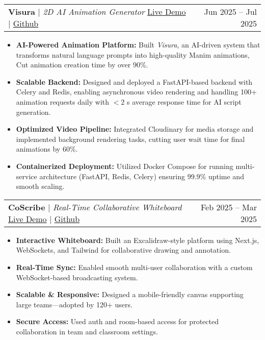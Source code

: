 \documentclass[letterpaper,11pt]{article}
\makeatletter
\newcommand{\resumeProjectHeading}[2]{
    \item
    \begin{tabular*}{0.97\textwidth}{l@{\extracolsep{\fill}}r}
      \small#1 & #2 \\
    \end{tabular*}\vspace{-7pt}
}
\makeatother
\begin{document}
    \resumeProjectHeading
           {\large \textbf{Visura} $|$ \emph{2D AI Animation Generator} 
           \href{https://visura.space/}{Live Demo} $|$    \href{https://github.com/Devansh-Sabharwal/visura}{Github}}{Jun 2025 – Jul 2025 } 
\begin{itemize}[leftmargin=0.3in,label={$\bullet$}]
    \item \textbf{AI-Powered Animation Platform:} Built \textit{Visura}, an AI-driven system that transforms natural language prompts into high-quality Manim animations, Cut animation creation time by over 90\%.
    \item \textbf{Scalable Backend:} Designed and deployed a FastAPI-based backend with Celery and Redis, enabling asynchronous video rendering and handling 100+ animation requests daily with $<$2 s average response time for AI script generation.
    \item \textbf{Optimized Video Pipeline:} Integrated Cloudinary for media storage and implemented background rendering tasks, cutting user wait time for final animations by 60\%.
    \item \textbf{Containerized Deployment:} Utilized Docker Compose for running multi-service architecture (FastAPI, Redis, Celery) ensuring 99.9\% uptime and smooth scaling.
\end{itemize}
    
    \resumeProjectHeading
           {\large \textbf{CoScribe} $|$ \emph{Real-Time Collaborative Whiteboard}
           \href{https://coscribe.onrender.com/}{Live Demo} $|$
           \href{https://github.com/Devansh-Sabharwal/CoScribe}{Github}}{Feb 2025 – Mar 2025} 
           \begin{itemize}[label={$\bullet$}]
                \item {\textbf{Interactive Whiteboard:} Built an Excalidraw-style platform using Next.js, WebSockets, and Tailwind for collaborative drawing and annotation.}
                \item {\textbf{Real-Time Sync:} Enabled smooth multi-user collaboration with a custom WebSocket-based broadcasting system.}
                \item {\textbf{Scalable \& Responsive:} Designed a mobile-friendly canvas supporting large teams—adopted by 120+ users.}
                \item {\textbf{Secure Access:} Used auth and room-based access for protected collaboration in team and classroom settings.}
            \end{itemize}
\end{document}
